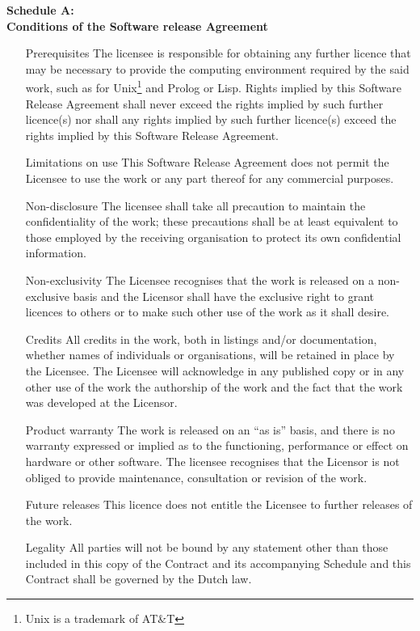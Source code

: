 \fillin \next
{}\fillin
\vspace{1cm}

\begin{center}
    \Large \bf Schedule A: \\
    Conditions of the Software release Agreement
\end{center}
\begin{enumerate}
    \item[Prerequisites]
The licensee is responsible for obtaining any further licence that may
be necessary to provide the computing environment required by the said
work, such as for Unix\footnote{Unix is a trademark of AT\&T} and Prolog
or Lisp.
Rights implied by this Software Release Agreement shall never exceed the
rights implied by such further licence(s) nor shall any rights implied
by such further licence(s) exceed the rights implied by this Software
Release Agreement.
    \item[Limitations on use]
This Software Release Agreement does not permit the Licensee to use the
work or any part thereof for any commercial purposes.
    \item[Non-disclosure]
The licensee shall take all precaution to maintain the confidentiality
of the work; these precautions shall be at least equivalent to those
employed by the receiving organisation to protect its own confidential
information. 
    \item[Non-exclusivity]
The Licensee recognises that the work is released on a non-exclusive
basis and the Licensor shall have the exclusive right to grant licences
to others or to make such other use of the work as it shall desire.
    \item[Credits]
All credits in the work, both in listings and/or documentation, whether
names of individuals or organisations, will be retained in place by the
Licensee. The Licensee will acknowledge in any published copy or in any
other use of the work the authorship of the work and the fact that the
work was developed at the Licensor.
    \item[Product warranty]
The work is released on an ``as is'' basis, and there is no warranty
expressed or  implied as to the functioning, performance or effect on
hardware or other software. The licensee recognises that the Licensor
is not obliged to provide maintenance, consultation or revision of the
work.
    \item[Future releases]
This licence does not entitle the Licensee to further releases of the
work.
    \item[Legality]
All parties will not be bound by any statement other than those included
in this copy of the Contract and its accompanying Schedule and this
Contract shall be governed by the Dutch law.
\end{enumerate}


